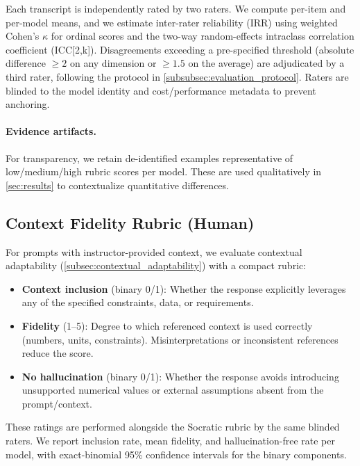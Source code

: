 \FloatBarrier

Each transcript is independently rated by two raters. We compute per-item and per-model means, and we estimate inter-rater reliability (IRR) using weighted Cohen's $\kappa$ for ordinal scores and the two-way random-effects intraclass correlation coefficient (ICC[2,k]). Disagreements exceeding a pre-specified threshold (absolute difference $\geq 2$ on any dimension or $\geq 1.5$ on the average) are adjudicated by a third rater, following the protocol in \cref{subsubsec:evaluation_protocol}. Raters are blinded to the model identity and cost/performance metadata to prevent anchoring.

\paragraph{Evidence artifacts.} For transparency, we retain de-identified examples representative of low/medium/high rubric scores per model. These are used qualitatively in \cref{sec:results} to contextualize quantitative differences.

\subsection{Context Fidelity Rubric (Human)}\label{subsec:context_fidelity_rubric}

For prompts with instructor-provided context, we evaluate contextual adaptability (\cref{subsec:contextual_adaptability}) with a compact rubric:

\begin{itemize}
	\item \textbf{Context inclusion} (binary 0/1): Whether the response explicitly leverages any of the specified constraints, data, or requirements.
	\item \textbf{Fidelity} (1--5): Degree to which referenced context is used correctly (numbers, units, constraints). Misinterpretations or inconsistent references reduce the score.
	\item \textbf{No hallucination} (binary 0/1): Whether the response avoids introducing unsupported numerical values or external assumptions absent from the prompt/context.
\end{itemize}

These ratings are performed alongside the Socratic rubric by the same blinded raters. We report inclusion rate, mean fidelity, and hallucination-free rate per model, with exact-binomial 95\% confidence intervals for the binary components.

